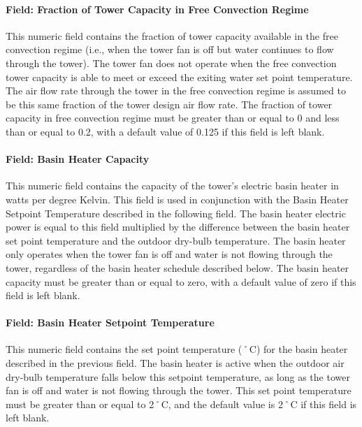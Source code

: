 \paragraph{Field: Fraction of Tower Capacity in Free Convection Regime}\label{field-fraction-of-tower-capacity-in-free-convection-regime}

This numeric field contains the fraction of tower capacity available in the free convection regime (i.e., when the tower fan is off but water continues to flow through the tower). The tower fan does not operate when the free convection tower capacity is able to meet or exceed the exiting water set point temperature. The air flow rate through the tower in the free convection regime is assumed to be this same fraction of the tower design air flow rate. The fraction of tower capacity in free convection regime must be greater than or equal to 0 and less than or equal to 0.2, with a default value of 0.125 if this field is left blank.

\paragraph{Field: Basin Heater Capacity}\label{field-basin-heater-capacity-3}

This numeric field contains the capacity of the tower's electric basin heater in watts per degree Kelvin. This field is used in conjunction with the Basin Heater Setpoint Temperature described in the following field. The basin heater electric power is equal to this field multiplied by the difference between the basin heater set point temperature and the outdoor dry-bulb temperature. The basin heater only operates when the tower fan is off and water is not flowing through the tower, regardless of the basin heater schedule described below. The basin heater capacity must be greater than or equal to zero, with a default value of zero if this field is left blank.

\paragraph{Field: Basin Heater Setpoint Temperature}\label{field-basin-heater-setpoint-temperature-3}

This numeric field contains the set point temperature (˚C) for the basin heater described in the previous field. The basin heater is active when the outdoor air dry-bulb temperature falls below this setpoint temperature, as long as the tower fan is off and water is not flowing through the tower. This set point temperature must be greater than or equal to 2˚C, and the default value is 2˚C if this field is left blank.

